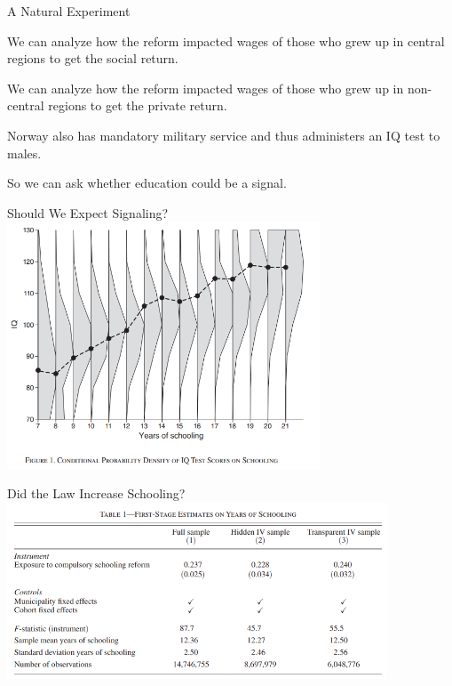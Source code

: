 \documentclass[aspectratio=169,usenames,dvipsnames]{beamer}
\newenvironment{wideitemize}{\itemize\addtolength{\itemsep}{10pt}}{\enditemize}
\begin{document}
\begin{frame}{A Natural Experiment}
    \begin{wideitemize}
       \item We can analyze how the reform impacted wages of those who grew up in central regions to get the social return.
       \item We can analyze how the reform impacted wages of those who grew up in non-central regions to get the private return.
       \item Norway also has mandatory military service and thus administers an IQ test to males.
       \item So we can ask whether education could be a signal.
    \end{wideitemize}
\end{frame}


\begin{frame}{Should We Expect Signaling?}
\centering
\includegraphics[width=0.7\textwidth]{pictures/iq_norway.png}
\end{frame}

\begin{frame}{Did the Law Increase Schooling?}
\centering
\includegraphics[width=0.85\textwidth]{pictures/norway_increase.png}
\end{frame}
\end{document}

